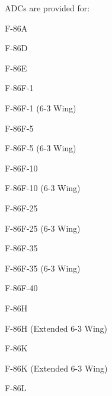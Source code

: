 ADCs are provided for:
\begin{adclist}
    \item F-86A
    \item F-86D
    \item F-86E
    \item F-86F-1
    \item F-86F-1 (6-3 Wing)
    \item F-86F-5
    \item F-86F-5 (6-3 Wing)
    \item F-86F-10
    \item F-86F-10 (6-3 Wing)
    \item F-86F-25
    \item F-86F-25 (6-3 Wing)
    \item F-86F-35
    \item F-86F-35 (6-3 Wing)
    \item F-86F-40
    \item F-86H
    \item F-86H (Extended 6-3 Wing)
    \item F-86K
    \item F-86K (Extended 6-3 Wing)
    \item F-86L
\end{adclist}